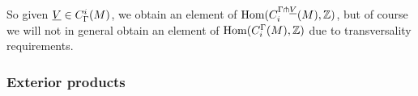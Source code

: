 So given $\underline{V} \in C^i_\Gamma(M)$, we obtain an element of $\textup{Hom}(C_i^{\Gamma \pitchfork \underline{V}}(M),\mathbb{Z})$, but of course we will not in general obtain an element of $\textup{Hom}(C_i^{\Gamma}(M),\mathbb{Z})$ due to transversality requirements.

\begin{comment}
	\begin{proof}
		If $\uV,\uW \in C^*_\Gamma(N)$ are represented by $f \colon V \to N$ and $g \colon W \to N$ that are transverse to $h$, then $\uV+\uW$ is represented by $V \sqcup W$, which will also be transverse to $h$.
		So $C^*_{\Gamma \pf h}(N)$ is closed under addition.
		If $f \colon V \to N$ is transverse to $h$ then so is $-f$, i.e.\ $f$ with the opposite co-orientation, so $C^*_{\Gamma \pf h}(N)$ is closed under taking negatives.
		The empty map $\emptyset \to N$ is always transverse to $h$ (since there are no points at which to check the tangent space condition), and so $0 \in C^*_{\Gamma \pf h}(N)$.
		Finally, if $\uV$ is represented by $f \colon V \to N$ transverse to $h$, then by definition $\bd V \to N$ is transverse to $h$, so $\bd \uV \in C^*_{\Gamma \pf h}(N)$.
		Therefore, $C^*_{\Gamma \pf h}(N)$, is a subcomplex of $C^*_{\Gamma}(N)$.

		To how that $h^*$ is well defined on $C^*_{\Gamma \pf h}(N)$ we must show that it does not depend on the choice of representative $V$.
		Suppose $V$ and $V'$ both represent $\uV$ and are transverse to $h$.
		Then $V \sqcup -V'$ is transverse to $h$ and an element of $Q^*(N)$.
		So by \cref{L: pullback map Q}, $h^*(V \sqcup -V')$, which is by definition $(V \sqcup -V') \times_N M = (V \times_N M) \sqcup (-V' \times_N M)$ mapping to $M$, is an element of $Q^*(M)$.
		So $h^*(V)$ and $h^*(V')$ represent the same element of $C^*_{\Gamma}(M)$.
		Thus $h^*$ is well defined.

		To see that $h^*$ is a homomorphism, let $V,W \to N$ represent elements of $C^*_{\Gamma}(N)$ that are transverse to $h$.
		Then
		$$h^*(\uV+\uW) = \underline{h^*(V \sqcup W)} = \underline{h^*(V) \sqcup h^*(W)} = \underline{h^*(V)}+\underline{h^*(W)},$$
		using the definitions, obvious properties of the pullback and \cref{L: co/chains well defined}.
		Furthermore, $h^*$ is a chain map by \cref{leibniz}, as $\bd M = \emptyset$.
	\end{proof}
\end{comment}

\subsubsection{Exterior products}\label{S: exterior chain products}


